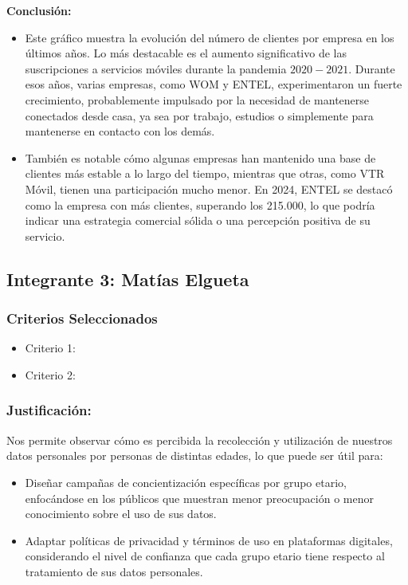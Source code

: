 \documentclass[12pt, a4paper]{article}
\begin{document}
\textbf{Conclusión:}  
\begin{itemize}
    \item Este gráfico muestra la evolución del número de clientes por empresa en los últimos años. Lo más destacable es el aumento significativo de las suscripciones a servicios móviles durante la pandemia \(2020-2021\).
    Durante esos años, varias empresas, como WOM y ENTEL, experimentaron un fuerte crecimiento, probablemente impulsado por la necesidad de mantenerse conectados desde casa, ya sea por trabajo, estudios o simplemente para mantenerse en contacto con los demás.
    \item También es notable cómo algunas empresas han mantenido una base de clientes más estable a lo largo del tiempo, mientras que otras, como VTR Móvil, tienen una participación mucho menor. En 2024, ENTEL se destacó como la empresa con más clientes, superando los 215.000, lo que podría indicar una estrategia comercial sólida o una percepción positiva de su servicio.

\end{itemize}


\subsection*{Integrante 3: Matías Elgueta}

\subsubsection*{Criterios Seleccionados}
\begin{itemize}
    \item Criterio 1: 
    \item Criterio 2: 
\end{itemize}

\subsubsection*{Justificación:}
Nos permite observar cómo es percibida la recolección y utilización de nuestros datos personales por personas de distintas edades, lo que puede ser útil para:

\begin{itemize}
    \item Diseñar campañas de concientización específicas por grupo etario, enfocándose en los públicos que muestran menor preocupación o menor conocimiento sobre el uso de sus datos.
    \item Adaptar políticas de privacidad y términos de uso en plataformas digitales, considerando el nivel de confianza que cada grupo etario tiene respecto al tratamiento de sus datos personales.
\end{itemize}
\end{document}
